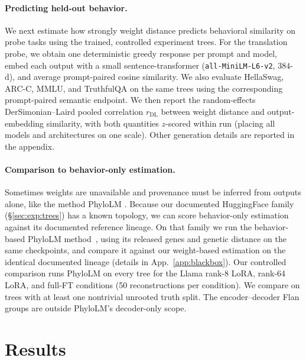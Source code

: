 \documentclass{article}
\theoremstyle{definition}
\theoremstyle{plain}
\begin{document}
\paragraph{Predicting held-out behavior.}
\label{sec:exp:behavioral}
We next estimate how strongly weight distance predicts behavioral similarity on probe tasks using the trained, controlled experiment trees. For the translation probe, we obtain one deterministic greedy response per prompt and model, embed each output with a small sentence-transformer (\texttt{all-MiniLM-L6-v2}, $384$-d), and average prompt-paired cosine similarity. We also evaluate HellaSwag, ARC-C, MMLU, and TruthfulQA on the same trees using the corresponding prompt-paired semantic endpoint. We then report the random-effects DerSimonian--Laird \citep{dersimonianlaird1986} pooled correlation $r_{\mathrm{DL}}$ between weight distance and output-embedding similarity, with both quantities $z$-scored within run (placing all models and architectures on one scale). Other generation details are reported in the appendix.




\paragraph{Comparison to behavior-only estimation.}
\label{sec:exp:blackbox}
Sometimes weights are unavailable and provenance must be inferred from outputs alone, like the method PhyloLM \citep{wu2026llmdna,yax2025phylolm}.  Because our documented HuggingFace family (\S\ref{sec:exp:trees}) has a known topology, we can score behavior-only estimation against its documented reference lineage. On that family we run the behavior-based PhyloLM method~\citep{yax2025phylolm}, using its released genes and genetic distance on the same checkpoints, and compare it against our weight-based estimation on the identical documented lineage (details in App.~\ref{app:blackbox}). Our controlled comparison runs PhyloLM on every tree for the Llama rank-8 LoRA, rank-64 LoRA, and full-FT conditions (50 reconstructions per condition). We compare on trees with at least one nontrivial unrooted truth split. The encoder--decoder Flan groups are outside PhyloLM's decoder-only scope.


\section{Results}
\label{sec:results}
\end{document}
